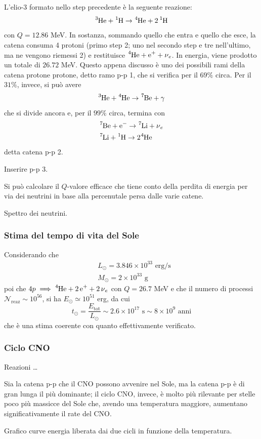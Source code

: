 \documentclass[11pt, a4paper]{scrartcl}
\theoremstyle{style}
\newenvironment{boxenv}[1][]{
    \begin{eqbox}[#1]
    }{
   \end{eqbox}
}
\numberwithin{equation}{subsection}
\begin{document}
L'elio-3 formato nello step precedente \`e la seguente reazione:
\[
	\ce{^3He + ^1H} \to  \ce{^4He + 2^1H}
\] 
con $Q = 12.86$ MeV.
In sostanza, sommando quello che entra e quello che esce, la catena consuma 4 protoni (primo step 2; uno nel secondo step e tre nell'ultimo, ma ne vengono riemessi 2) e restituisce $\ce{^4He + e+ + \nu _e}$.
In energia, viene prodotto un totale di $26.72$ MeV.
Questo appena discusso \`e uno dei possibili rami della catena protone protone, detto ramo p-p 1, che si verifica per il $69\%$ circa.
Per il $31\%$, invece, si pu\`o avere 
\[
	\ce{^{3}He + ^4He} \to  \ce{^7Be + \gamma}
\] 
che si divide ancora e, per il $99\%$ circa, termina con 
\[
	\begin{split}
		&\ce{^7Be + e-} \to \ce{^7Li +\nu _e}\\
		& \ce{^7Li + ^1H} \to 2\ce{^4He}
	\end{split} 
\] 
detta catena p-p 2.
\begin{boxenv}[]
Inserire p-p 3.
\end{boxenv}
\noindent Si pu\`o calcolare il $Q$-valore efficace che tiene conto della perdita di energia per via dei neutrini in base alla percenutale persa dalle varie catene.
\begin{boxenv}[]
Spettro dei neutrini.
\end{boxenv}
\subsubsection{Stima del tempo di vita del Sole}

Considerando che
\[
	\begin{split}
		&L_\odot = 3.846 \times 10^{33} \text{ erg} / \text{s}\\
		&M_\odot  = 2 \times 10^{33} \text{ g}
	\end{split}
\] 
poi che $4p \implies \ce{^4He + 2e+ + 2\nu_e}$ con $Q = 26.7$ MeV e che il numero di processi $\mathcal{N} _\text{reaz} \sim 10^{56}$, si ha $E_\odot \simeq 10^{51}$ erg, da cui
\[
t_\odot = \frac{E_\text{tot}}{L_\odot } \sim 2.6 \times 10^{17} \text{ s} \sim 8\times 10^{9} \text{ anni}
\] 
che \`e una stima coerente con quanto effettivamente verificato.

\subsubsection{Ciclo CNO}
\begin{boxenv}[]
Reazioni \ldots
\end{boxenv}
\noindent Sia la catena p-p che il CNO possono avvenire nel Sole, ma la catena p-p \`e di gran lunga il pi\`u dominante; il ciclo CNO, invece, \`e molto pi\`u rilevante per stelle poco pi\`u massicce del Sole che, avendo una temperatura maggiore, aumentano significativamente il rate del CNO.
\begin{boxenv}[]
Grafico curve energia liberata dai due cicli in funzione della temperatura.
\end{boxenv}
\end{document}
